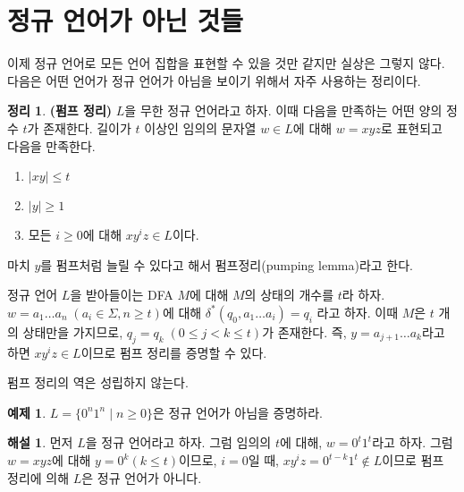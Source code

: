 \documentclass[b5paper, 11pt]{book}
\theoremstyle{definition}
\newtheorem{thm}[defn]{정리}
\newtheorem{ex}[defn]{예제}
\newtheorem*{ans*}{해설}
\newenvironment{pf*}{\pushQED{\qed}\pf}
{\popQED\endpf}
\begin{document}
\section{정규 언어가 아닌 것들}
이제 정규 언어로 모든 언어 집합을 표현할 수 있을 것만 같지만 실상은 그렇지 않다. 다음은 어떤 언어가 정규 언어가 아님을 보이기 위해서 자주 사용하는 정리이다.
\begin{thm}
    \textbf{(펌프 정리)}
    $L$을 무한 정규 언어라고 하자. 이때 다음을 만족하는 어떤 양의 정수 $t$가 존재한다. 길이가 $t$ 이상인 임의의 문자열 $w \in L$에 대해 $w = xyz$로 표현되고 다음을 만족한다.
\begin{enumerate}
    \item $\vert xy \vert \le t$
    \item $\vert y \vert \ge 1$
    \item 모든 $i \ge 0$에 대해 $xy^{i}z \in L$이다.
\end{enumerate}
\end{thm}
마치 $y$를 펌프처럼 늘릴 수 있다고 해서 펌프정리(pumping lemma)라고 한다. 
\begin{pf*}
    정규 언어 $L$을 받아들이는 DFA $M$에 대해 $M$의 상태의 개수를 $t$라 하자.
$w = a_1 \ldots a_n \; (a_i \in \Sigma, n \ge t)$에 대해 $\delta^*(q_0, a_1 \ldots a_i) = q_i$
라고 하자. 이때 $M$은 $t$ 개의 상태만을 가지므로, $q_j = q_k \; (0 \le j < k \le t) $가
존재한다. 즉, $y = a_{j+1} \ldots a_k$라고 하면 $xy^iz \in L$이므로 펌프 정리를 증명할 수 있다.  
\begin{figure}[ht]
    \centering
    \caption{} 
    \label{pump}
\end{figure}
\end{pf*}
펌프 정리의 역은 성립하지 않는다. 
\begin{ex} \label{0n1n}
$L = \{0^n 1^n \;\vert\; n \ge 0\}$은 정규 언어가 아님을 증명하라.
\end{ex}
\begin{ans*}
    먼저 $L$을 정규 언어라고 하자. 그럼 임의의 $t$에 대해, $w = 0^t 1^t$라고 하자. 그럼 $w=xyz$에 대해 $y = 0^k (k \le t)$이므로, $i=0$일 때, $xy^iz= 0^{t-k} 1^t \notin L$이므로 펌프 정리에 의해 $L$은 정규 언어가 아니다. 
\end{ans*}
\end{document}
